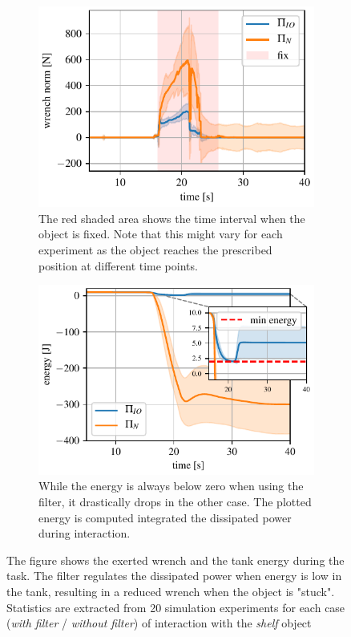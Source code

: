 \begin{figure}[t]
\centering
\hspace*{-0.0cm} 
\begin{subfigure}{0.8\columnwidth}
    \includegraphics[width=\linewidth]{figures/fix_experiment/wrench_with_without_tank.pdf}
    \caption{The red shaded area shows the time interval when the object is fixed. Note that this might vary for each experiment as the object reaches the prescribed position at different time points.}
\end{subfigure}
\hspace*{-0.0cm} 
\begin{subfigure}{0.8\columnwidth}
    \includegraphics[width=\linewidth]{figures/fix_experiment/energy_with_without_tank.pdf}
    \caption{While the energy is always below zero when using the filter, it drastically drops in the other case. The plotted energy is computed integrated the dissipated power during interaction.}
\end{subfigure}
\hfill
\caption{The figure shows the exerted wrench and the tank energy during the task. The filter regulates the dissipated power when energy is low in the tank, resulting in a reduced wrench when the object is "stuck". Statistics are extracted from 20 simulation experiments for each case (\emph{with filter} / \emph{without filter}) of interaction with the \textit{shelf} object}\label{fig:tank_comparison}
\end{figure}


